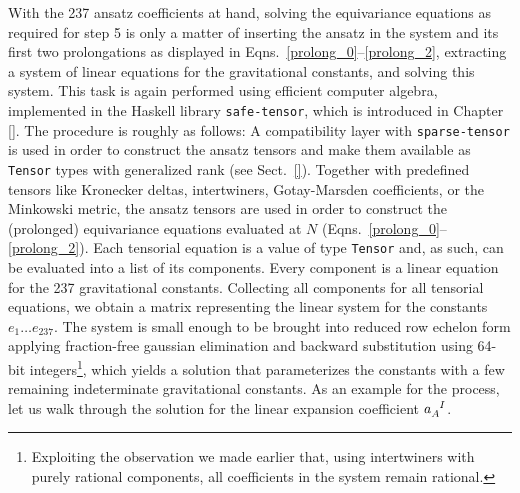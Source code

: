 With the 237 ansatz coefficients at hand, solving the equivariance equations as required for step 5 is only a matter of inserting the ansatz in the system and its first two prolongations as displayed in Eqns.~\ref{prolong_0}--\ref{prolong_2}, extracting a system of linear equations for the gravitational constants, and solving this system. This task is again performed using efficient computer algebra, implemented in the Haskell library \texttt{safe-tensor}, which is introduced in Chapter \ref{}. The procedure is roughly as follows: A compatibility layer with \texttt{sparse-tensor} is used in order to construct the ansatz tensors and make them available as \texttt{Tensor} types with generalized rank (see Sect.~\ref{}). Together with predefined tensors like Kronecker deltas, intertwiners, Gotay-Marsden coefficients, or the Minkowski metric, the ansatz tensors are used in order to construct the (prolonged) equivariance equations evaluated at $N$ (Eqns.~\ref{prolong_0}--\ref{prolong_2}). Each tensorial equation is a value of type \texttt{Tensor} and, as such, can be evaluated into a list of its components. Every component is a linear equation for the 237 gravitational constants. Collecting all components for all tensorial equations, we obtain a matrix representing the linear system for the constants $e_1\dots e_{237}$. The system is small enough to be brought into reduced row echelon form applying fraction-free gaussian elimination and backward substitution using 64-bit integers\footnote{Exploiting the observation we made earlier that, using intertwiners with purely rational components, all coefficients in the system remain rational.}, which yields a solution that parameterizes the constants with a few remaining indeterminate gravitational constants. As an example for the process, let us walk through the solution for the linear expansion coefficient $a_A^{\hphantom AI}$.

